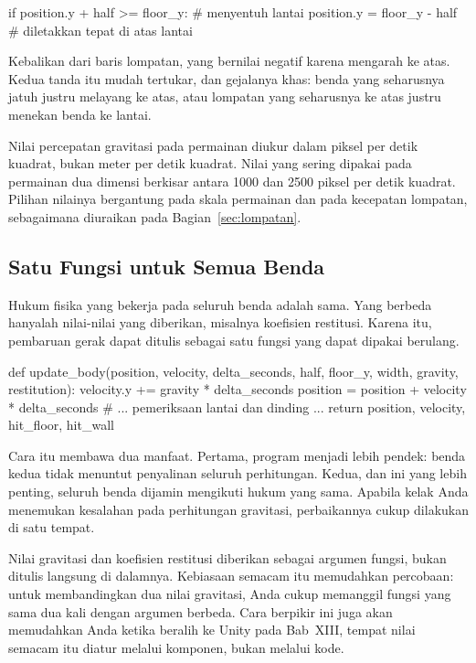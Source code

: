 \begin{kodekeluaran}
if position.y + half >= floor_y:      # menyentuh lantai
    position.y = floor_y - half       # diletakkan tepat di atas lantai
\end{kodekeluaran}

Kebalikan dari baris lompatan, yang bernilai negatif karena mengarah ke atas.
Kedua tanda itu mudah tertukar, dan gejalanya khas: benda yang seharusnya
jatuh justru melayang ke atas, atau lompatan yang seharusnya ke atas justru
menekan benda ke lantai.

\begin{catatabox}
Nilai percepatan gravitasi pada permainan diukur dalam piksel per detik
kuadrat, bukan meter per detik kuadrat. Nilai yang sering dipakai pada
permainan dua dimensi berkisar antara 1000 dan 2500 piksel per detik kuadrat.
Pilihan nilainya bergantung pada skala permainan dan pada kecepatan lompatan,
sebagaimana diuraikan pada Bagian~\ref{sec:lompatan}.
\end{catatabox}

\subsection{Satu Fungsi untuk Semua Benda}

Hukum fisika yang bekerja pada seluruh benda adalah sama.
Yang berbeda hanyalah nilai-nilai yang diberikan, misalnya koefisien
restitusi. Karena itu, pembaruan gerak dapat ditulis sebagai satu fungsi yang
dapat dipakai berulang.

\begin{kodekeluaran}
def update_body(position, velocity, delta_seconds, half, floor_y, width,
                gravity, restitution):
    velocity.y += gravity * delta_seconds
    position = position + velocity * delta_seconds
    # ... pemeriksaan lantai dan dinding ...
    return position, velocity, hit_floor, hit_wall
\end{kodekeluaran}

Cara itu membawa dua manfaat. Pertama, program menjadi lebih pendek: benda
kedua tidak menuntut penyalinan seluruh perhitungan. Kedua, dan ini yang lebih
penting, seluruh benda dijamin mengikuti hukum yang sama. Apabila kelak Anda
menemukan kesalahan pada perhitungan gravitasi, perbaikannya cukup dilakukan
di satu tempat.

\begin{tipsbox}
Nilai gravitasi dan koefisien restitusi diberikan sebagai
argumen fungsi, bukan ditulis langsung di dalamnya. Kebiasaan semacam itu
memudahkan percobaan: untuk membandingkan dua nilai gravitasi, Anda cukup
memanggil fungsi yang sama dua kali dengan argumen berbeda. Cara berpikir ini
juga akan memudahkan Anda ketika beralih ke Unity pada Bab~XIII, tempat nilai
semacam itu diatur melalui komponen, bukan melalui kode.
\end{tipsbox}
